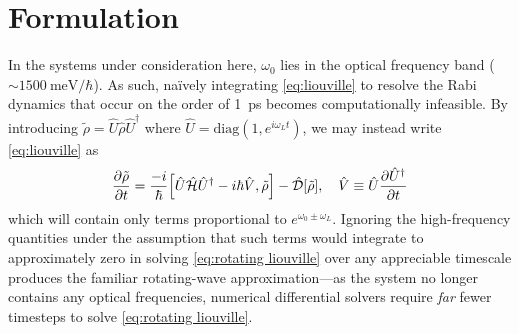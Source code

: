 \section{Formulation}


In the systems under consideration here, $\omega_0$ lies in the optical frequency band ($\sim \SI{1500}{\milli\eV\per\hbar}$).
As such, na\"ively integrating \cref{eq:liouville} to resolve the Rabi dynamics that occur on the order of \SI{1}{\pico\second} becomes computationally infeasible.
By introducing $\tilde{\rho} = \hat{U} \hat{\rho} \hat{U}^\dagger$ where $\hat{U} = \mathrm{diag}(1, e^{i \omega_L t})$, we may instead write \cref{eq:liouville} as
\begin{equation}
  \pdv{\tilde{\rho}}{t} = \frac{-i}{\hbar} \commutator{\hat{U} \hat{\mathcal{H}} \hat{U}^\dagger - i \hbar \hat{V}}{\tilde{\rho}} - \hat{\mathcal{D}}\qty[\tilde{\rho}], \quad \hat{V} \equiv \hat{U} \pdv{\hat{U}^\dagger}{t}
  \label{eq:rotating liouville}
\end{equation}
which will contain only terms proportional to $e^{\omega_0 \pm \omega_L}$.
Ignoring the high-frequency quantities under the assumption that such terms would integrate to approximately zero in solving \cref{eq:rotating liouville} over any appreciable timescale produces the familiar rotating-wave approximation\cite{}---as the system no longer contains any optical frequencies, numerical differential solvers require \emph{far} fewer timesteps to solve \cref{eq:rotating liouville}.



